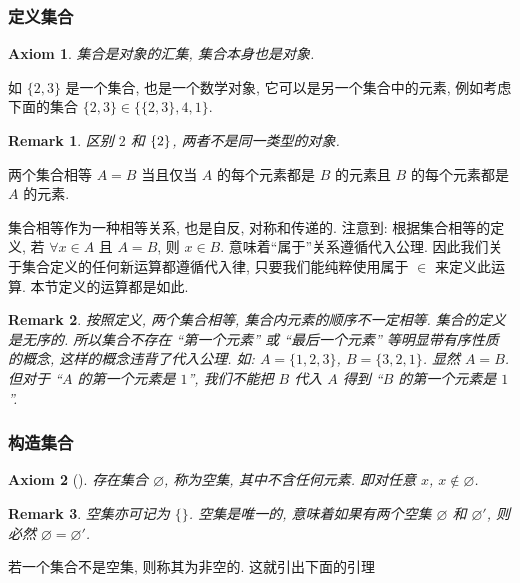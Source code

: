 \documentclass[UTF8]{ctexart}
\theoremstyle{mystyle}
\newtheorem{axiom}{Axiom}[section]
\theoremstyle{myremark}
\newtheorem*{remark}{Remark}
\theoremstyle{plain}
\DeclarePairedDelimiter\set{\{}{\}}
\begin{document}
\subsubsection{定义集合}
\begin{axiom}
    集合是对象的汇集, 集合本身也是对象. 
\end{axiom}

如 $ \{2, 3\} $ 是一个集合, 也是一个数学对象, 它可以是另一个集合中的元素, 例如考虑下面的集合 $ \{2, 3\} \in \{\{2, 3\}, 4, 1\} $.

\begin{remark}
    区别 $ 2 $ 和 $ \set{2} $, 两者不是同一类型的对象.
\end{remark}

\begin{definition}
    两个集合相等 $ A = B $ 当且仅当 $ A $ 的每个元素都是 $ B $ 的元素且 $ B $ 的每个元素都是 $ A $ 的元素.
\end{definition}

集合相等作为一种相等关系, 也是自反, 对称和传递的. 注意到: 根据集合相等的定义, 若 $ \forall x \in A $ 且 $ A = B $, 则 $ x \in B $. 意味着``属于''关系遵循代入公理. 因此我们关于集合定义的任何新运算都遵循代入律, 只要我们能纯粹使用属于 $ \in $ 来定义此运算. 本节定义的运算都是如此.

\begin{remark}
    按照定义, 两个集合相等, 集合内元素的顺序不一定相等. 集合的定义是无序的. 所以集合不存在 ``第一个元素'' 或 ``最后一个元素'' 等明显带有序性质的概念, 这样的概念违背了代入公理. 如: $ A = \{1, 2, 3 \} $, $ B = \{3, 2, 1\} $. 显然 $ A = B $. 但对于 ``$ A $ 的第一个元素是 $ 1 $'', 我们不能把 $ B $ 代入 $ A $ 得到 ``$ B $ 的第一个元素是 $ 1 $''.
\end{remark}

\subsubsection{构造集合}
\begin{axiom}[]
    存在集合 $ \varnothing $, 称为空集, 其中不含任何元素. 即对任意 $ x $, $ x \not\in \varnothing $.
\end{axiom}    

\begin{remark}
    空集亦可记为 $ \{\} $. 空集是唯一的, 意味着如果有两个空集 $ \varnothing $ 和 $ \varnothing' $, 则必然 $ \varnothing = \varnothing' $.
\end{remark}

若一个集合不是空集, 则称其为非空的. 这就引出下面的引理
\end{document}
